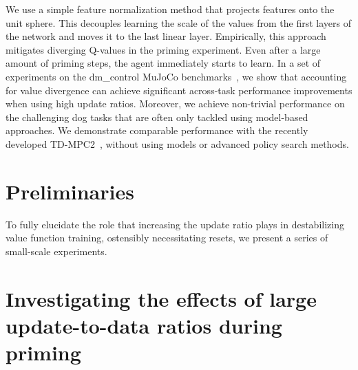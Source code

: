 We use a simple feature normalization method \parencite{zhang2019root, wang2020striving, bjorck2022is} that projects features onto the unit sphere.
This decouples learning the scale of the values from the first layers of the network and moves it to the last linear layer.
Empirically, this approach mitigates diverging Q-values in the priming experiment. 
Even after a large amount of priming steps, the agent immediately starts to learn. %
In a set of experiments on the \textsf{dm\_control} MuJoCo benchmarks~\parencite{tunyasuvunakool2020dmcontrol}, we show that accounting for value divergence can achieve significant across-task performance improvements when using high update ratios. 
Moreover, we achieve non-trivial performance on the challenging dog tasks that are often only tackled using model-based approaches. We demonstrate comparable performance with the recently developed TD-MPC2~\parencite{hansen2024tdmpc}, without using models or advanced policy search methods.


\section{Preliminaries} \label{sec:preliminaries}

To fully elucidate the role that increasing the update ratio plays in destabilizing value function training, ostensibly necessitating resets, we present a series of small-scale experiments.

\section{Investigating the effects of large update-to-data ratios during priming} \label{sec:investigating}

